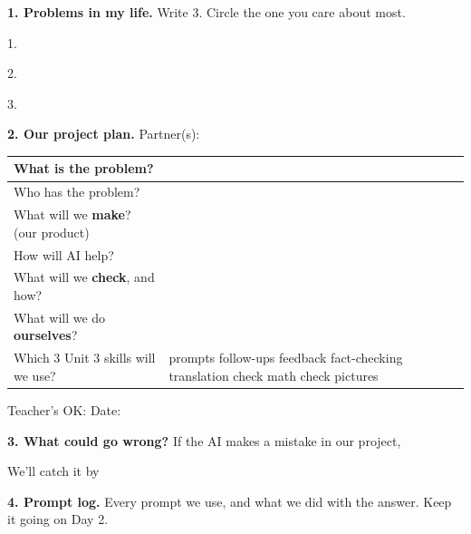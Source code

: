 \documentclass[11pt]{article}
\begin{document}
\partner

\vspace{0.4em}
{\large\textbf{1. Problems in my life.}} Write 3. Circle the one you care about most.

\vspace{0.5em}
1. 

\vspace{0.4em}
2. \blank{6.6in}

\vspace{0.4em}
3. \blank{6.6in}

\vspace{1.0em}
{\large\textbf{2. Our project plan.}} \quad Partner(s): \blank{3.6in}

\vspace{0.3em}
\begin{tabular}{|R{2.2in}|R{4.3in}|}
\hline
What is the \textbf{problem}? &  \\[2.0em] \hline
Who has the problem? & \\[1.4em] \hline
What will we \textbf{make}? (our product) & \\[2.0em] \hline
How will AI help? & \\[2.0em] \hline
What will we \textbf{check}, and how? & \\[2.0em] \hline
What will we do \textbf{ourselves}? & \\[2.0em] \hline
Which 3 Unit 3 skills will we use? & prompts \quad follow-ups \quad feedback \quad fact-checking \quad translation check \quad math check \quad pictures \\ \hline
\end{tabular}

\vspace{0.8em}
Teacher's OK: \blank{2.5in} \qquad Date: \blank{1.5in}

\vspace{1.0em}
{\large\textbf{3. What could go wrong?}} If the AI makes a mistake in our project,

\vspace{0.6em}

\vspace{0.6em}
We'll catch it by 

\newpage

{\large\textbf{4. Prompt log.}} Every prompt we use, and what we did with the answer. Keep it going on Day 2.
\end{document}
